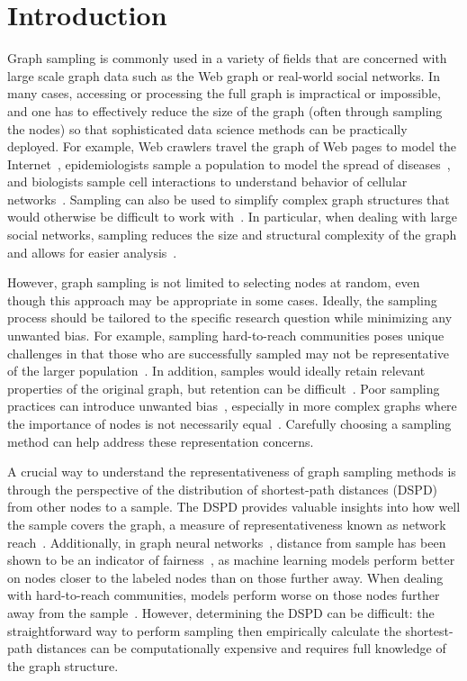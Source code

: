 \section{Introduction}
\label{sec:intro}

Graph sampling is commonly used in a variety of fields that are concerned with large scale graph data such as the Web graph or real-world social networks. In many cases, accessing or processing the full graph is impractical or impossible, and one has to effectively reduce the size of the graph (often through sampling the nodes) so that sophisticated data science methods can be practically deployed. For example, Web crawlers travel the graph of Web pages to model the Internet~\cite{boldi2004your}, epidemiologists sample a population to model the spread of diseases~\cite{cohen2003efficient}, and biologists sample cell interactions to understand behavior of cellular networks~\cite{aittokallio2006graph}. Sampling can also be used to simplify complex graph structures that would otherwise be difficult to work with~\cite{kurant2012coarse}. In particular, when dealing with large social networks, sampling reduces the size and structural complexity of the graph and allows for easier analysis~\cite{wang2011understanding}. 

However, graph sampling is not limited to selecting nodes at random, even though this approach may be appropriate in some cases. Ideally, the sampling process should be tailored to the specific research question while minimizing any unwanted bias. For example, sampling hard-to-reach communities poses unique challenges in that those who are successfully sampled may not be representative of the larger population~\cite{salganik2004sampling}. In addition, samples would ideally retain relevant properties of the original graph, but retention can be difficult~\cite{stumpf2005subnets}. Poor sampling practices can introduce unwanted bias~\cite{maiya2011benefits}, especially in more complex graphs where the importance of nodes is not necessarily equal~\cite{stutzbach2006sampling}. Carefully choosing a sampling method can help address these representation concerns.

A crucial way to understand the representativeness of graph sampling methods is through the perspective of the distribution of shortest-path distances (DSPD) from other nodes to a sample.
The DSPD provides valuable insights into how well the sample covers the graph, a measure of representativeness known as network reach~\cite{maiya2011benefits}.
Additionally, in graph neural networks~\cite{scarselli2008graph}, distance from sample has been shown to be an indicator of fairness~\cite{ma2021subgroup}, as machine learning models perform better on nodes closer to the labeled nodes than on those further away.
When dealing with hard-to-reach communities, models perform worse on those nodes further away from the sample~\cite{heckathorn2017network}. However, determining the DSPD can be difficult: the straightforward way to perform sampling then empirically calculate the shortest-path distances can be computationally expensive and requires full knowledge of the graph structure.

